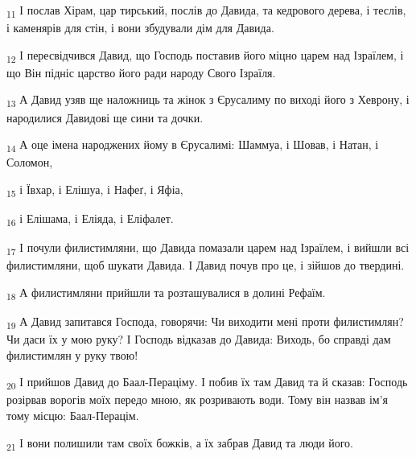 \begin{tcolorbox}
\textsubscript{11} І послав Хірам, цар тирський, послів до Давида, та кедрового дерева, і теслів, і каменярів для стін, і вони збудували дім для Давида.
\end{tcolorbox}
\begin{tcolorbox}
\textsubscript{12} І пересвідчився Давид, що Господь поставив його міцно царем над Ізраїлем, і що Він підніс царство його ради народу Свого Ізраїля.
\end{tcolorbox}
\begin{tcolorbox}
\textsubscript{13} А Давид узяв ще наложниць та жінок з Єрусалиму по виході його з Хеврону, і народилися Давидові ще сини та дочки.
\end{tcolorbox}
\begin{tcolorbox}
\textsubscript{14} А оце імена народжених йому в Єрусалимі: Шаммуа, і Шовав, і Натан, і Соломон,
\end{tcolorbox}
\begin{tcolorbox}
\textsubscript{15} і Ївхар, і Елішуа, і Нафеґ, і Яфіа,
\end{tcolorbox}
\begin{tcolorbox}
\textsubscript{16} і Елішама, і Еліяда, і Еліфалет.
\end{tcolorbox}
\begin{tcolorbox}
\textsubscript{17} І почули филистимляни, що Давида помазали царем над Ізраїлем, і вийшли всі филистимляни, щоб шукати Давида. І Давид почув про це, і зійшов до твердині.
\end{tcolorbox}
\begin{tcolorbox}
\textsubscript{18} А филистимляни прийшли та розташувалися в долині Рефаїм.
\end{tcolorbox}
\begin{tcolorbox}
\textsubscript{19} А Давид запитався Господа, говорячи: Чи виходити мені проти филистимлян? Чи даси їх у мою руку? І Господь відказав до Давида: Виходь, бо справді дам филистимлян у руку твою!
\end{tcolorbox}
\begin{tcolorbox}
\textsubscript{20} І прийшов Давид до Баал-Пераціму. І побив їх там Давид та й сказав: Господь розірвав ворогів моїх передо мною, як розривають води. Тому він назвав ім'я тому місцю: Баал-Перацім.
\end{tcolorbox}
\begin{tcolorbox}
\textsubscript{21} І вони полишили там своїх божків, а їх забрав Давид та люди його.
\end{tcolorbox}
